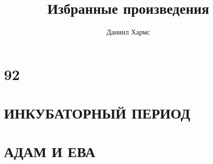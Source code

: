 \documentclass{article}
\title{Избранные произведения}
\author{Даниил Хармс}
\date{}
\begin{document}
	
	\maketitle
	
	\section{92}
	
	
	\section{ИНКУБАТОРНЫЙ ПЕРИОД}
	
	
	\section{АДАМ И ЕВА}
	
	
\end{document}
